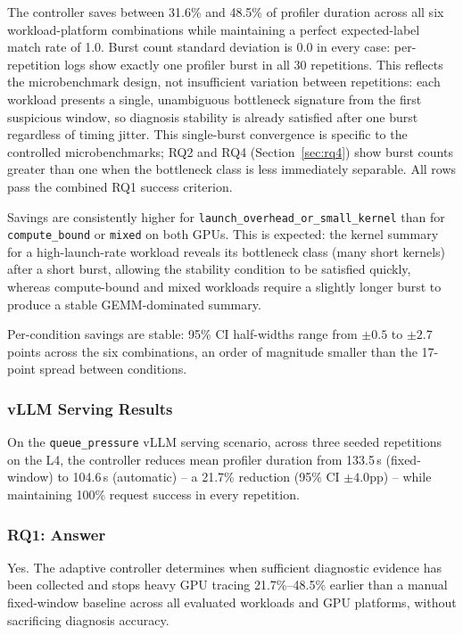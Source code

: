 The controller saves between 31.6\% and 48.5\% of profiler duration across all six workload-platform combinations while maintaining a perfect expected-label match rate of 1.0. Burst count standard deviation is 0.0 in every case: per-repetition logs show exactly one profiler burst in all 30 repetitions. This reflects the microbenchmark design, not insufficient variation between repetitions: each workload presents a single, unambiguous bottleneck signature from the first suspicious window, so diagnosis stability is already satisfied after one burst regardless of timing jitter. This single-burst convergence is specific to the controlled microbenchmarks; RQ2 and RQ4 (Section~\ref{sec:rq4}) show burst counts greater than one when the bottleneck class is less immediately separable. All rows pass the combined RQ1 success criterion.

Savings are consistently higher for \texttt{launch\_overhead\_or\_small\_kernel} than for \texttt{compute\_bound} or \texttt{mixed} on both GPUs. This is expected: the kernel summary for a high-launch-rate workload reveals its bottleneck class (many short kernels) after a short burst, allowing the stability condition to be satisfied quickly, whereas compute-bound and mixed workloads require a slightly longer burst to produce a stable GEMM-dominated summary.

Per-condition savings are stable: 95\% CI half-widths range from $\pm 0.5$ to $\pm 2.7$ points across the six combinations, an order of magnitude smaller than the 17-point spread between conditions.



\subsubsection{vLLM Serving Results}

On the \texttt{queue\_pressure} vLLM serving scenario, across three seeded repetitions on the L4, the controller reduces mean profiler duration from 133.5\,s (fixed-window) to 104.6\,s (automatic) -- a 21.7\% reduction (95\% CI $\pm 4.0$pp) -- while maintaining 100\% request success in every repetition.

\subsubsection{RQ1: Answer}

Yes. The adaptive controller determines when sufficient diagnostic evidence has been collected and stops heavy GPU tracing 21.7\%--48.5\% earlier than a manual fixed-window baseline across all evaluated workloads and GPU platforms, without sacrificing diagnosis accuracy.